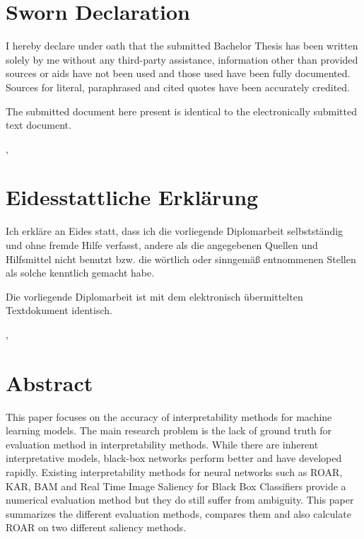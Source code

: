 
	\ifeng \chapter*{Sworn Declaration}
	I hereby declare under oath that the submitted Bachelor Thesis has been written solely by me without any third-party assistance, information other than provided sources or aids have not been used and those used have been fully documented. Sources for literal, paraphrased and cited quotes have been accurately credited.

	The submitted document here present is identical to the electronically submitted text document.

	\vskip1cm
	\place, \date

	\else \chapter*{Eidesstattliche Erklärung}
	Ich erkläre an Eides statt, dass ich die vorliegende Diplomarbeit selbstständig und ohne fremde Hilfe verfasst, andere als die angegebenen Quellen und Hilfsmittel nicht benutzt bzw. die wörtlich oder sinngemäß entnommenen Stellen als solche kenntlich gemacht habe.

	Die vorliegende Diplomarbeit ist mit dem elektronisch übermittelten Textdokument identisch.

	\vskip1cm
	\place, \date
	\fi

		\chapter*{Abstract}

	This paper focuses on the accuracy of interpretability methods for machine learning models. The main research problem is the lack of ground truth for evaluation method in interpretability methods. While there are inherent interpretative models, black-box networks perform better and have developed rapidly. Existing interpretability methods for neural networks such as ROAR, KAR, BAM and Real Time Image Saliency for Black Box Classifiers provide a numerical evaluation method but they do still suffer from ambiguity.
	This paper summarizes the different evaluation methods, compares them and also calculate ROAR on two different saliency methods.
	
	


